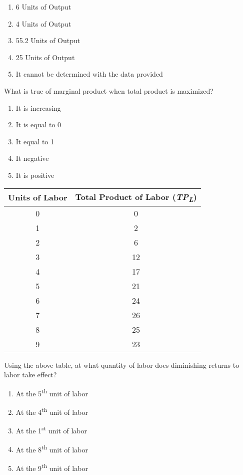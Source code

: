 \documentclass[12pt]{article}
\begin{document}
\begin{enumerate}[label = (\alph*)]
	\item 6 Units of Output
	\item 4 Units of Output
	\item 55.2 Units of Output
	\item 25 Units of Output
	\item It cannot be determined with the data provided
\end{enumerate}


\begin{flushleft}
What is true of marginal product when total product is maximized?
\end{flushleft}

\begin{enumerate}[label = (\alph*)]
	\item It is increasing
	\item It is equal to 0
	\item It equal to 1
	\item It negative
	\item It is positive
\end{enumerate}


\begin{center}
\begin{tabular}{ |c|c| }
	\hline
	\textbf{Units of Labor} & \textbf{Total Product of Labor (\emph{TP\textsubscript{L}})} \\
	\hline
	0 & 0 \\
	1 & 2 \\
	2 & 6 \\
	3 & 12 \\
	4 & 17 \\
	5 & 21 \\
	6 & 24 \\
	7 & 26 \\
	8 & 25 \\
	9 & 23 \\
	\hline
\end{tabular}
\end{center}

\begin{flushleft}
Using the above table, at what quantity of labor does diminishing returns to labor take effect?
\end{flushleft}

\begin{enumerate}[label = (\alph*)]
	\item At the 5\textsuperscript{th} unit of labor
	\item At the 4\textsuperscript{th} unit of labor
	\item At the 1\textsuperscript{st} unit of labor
	\item At the 8\textsuperscript{th} unit of labor
	\item At the 9\textsuperscript{th} unit of labor
\end{enumerate}
\end{document}

